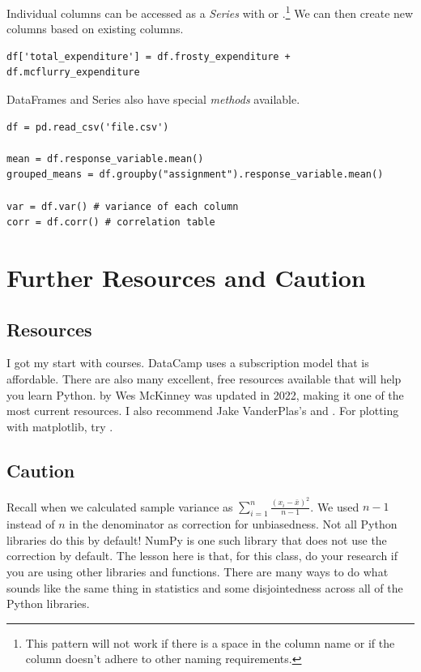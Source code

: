 \documentclass{article}
\begin{document}
Individual columns can be accessed as a \emph{Series} with  or .\footnote{This pattern will not work if there is a space in the column name or if the column doesn't adhere to other naming requirements.} We can then create new columns based on existing columns. 

\begin{lstlisting}
df['total_expenditure'] = df.frosty_expenditure + df.mcflurry_expenditure
\end{lstlisting}

\noindent DataFrames and Series also have special \emph{methods} available. 

\begin{lstlisting}
df = pd.read_csv('file.csv')

mean = df.response_variable.mean()
grouped_means = df.groupby("assignment").response_variable.mean()

var = df.var() # variance of each column
corr = df.corr() # correlation table
\end{lstlisting}

\section{Further Resources and Caution}

\subsection{Resources}

I got my start with  courses. DataCamp uses a subscription model that is affordable. There are also many excellent, free resources available that will help you learn Python.  by Wes McKinney was updated in 2022, making it one of the most current resources. I also recommend Jake VanderPlas's  and . For plotting with matplotlib, try . 

\subsection{Caution}

Recall when we calculated sample variance as $\sum_{i=1}^n \frac{(x_i - \bar{x})^2}{n-1}$. We used $n-1$ instead of $n$ in the denominator as correction for unbiasedness. Not all Python libraries do this by default! NumPy is one such library that does not use the correction by default. The lesson here is that, for this class, do your research if you are using other libraries and functions. There are many ways to do what sounds like the same thing in statistics and some disjointedness across all of the Python libraries. 
\end{document}
